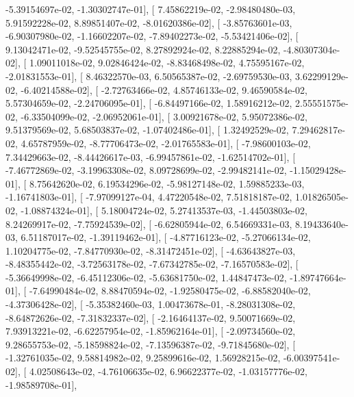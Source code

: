 \documentclass{article}
\begin{document}
         -5.39154697e-02,  -1.30302747e-01],
       [  7.45862219e-02,  -2.98480480e-03,   5.91592228e-02,
          8.89851407e-02,  -8.01620386e-02],
       [ -3.85763601e-03,  -6.90307980e-02,  -1.16602207e-02,
         -7.89402273e-02,  -5.53421406e-02],
       [  9.13042471e-02,  -9.52545755e-02,   8.27892924e-02,
          8.22885294e-02,  -4.80307304e-02],
       [  1.09011018e-02,   9.02846424e-02,  -8.83468498e-02,
          4.75595167e-02,  -2.01831553e-01],
       [  8.46322570e-03,   6.50565387e-02,  -2.69759530e-03,
          3.62299129e-02,  -6.40214588e-02],
       [ -2.72763466e-02,   4.85746133e-02,   9.46590584e-02,
          5.57304659e-02,  -2.24706095e-01],
       [ -6.84497166e-02,   1.58916212e-02,   2.55551575e-02,
         -6.33504099e-02,  -2.06952061e-01],
       [  3.00921678e-02,   5.95072386e-02,   9.51379569e-02,
          5.68503837e-02,  -1.07402486e-01],
       [  1.32492529e-02,   7.29462817e-02,   4.65787959e-02,
         -8.77706473e-02,  -2.01765583e-01],
       [ -7.98600103e-02,   7.34429663e-02,  -8.44426617e-03,
         -6.99457861e-02,  -1.62514702e-01],
       [ -7.46772869e-02,  -3.19963308e-02,   8.09728699e-02,
         -2.99482141e-02,  -1.15029428e-01],
       [  8.75642620e-02,   6.19534296e-02,  -5.98127148e-02,
          1.59885233e-03,  -1.16741803e-01],
       [ -7.97099127e-04,   4.47220548e-02,   7.51818187e-02,
          1.01826505e-02,  -1.08874324e-01],
       [  5.18004724e-02,   5.27413537e-03,  -1.44503803e-02,
          8.24269917e-02,  -7.75924539e-02],
       [ -6.62805944e-02,   6.54669331e-03,   8.19433640e-03,
          6.51187017e-02,  -1.39119462e-01],
       [ -4.87716123e-02,  -5.27066134e-02,   1.10204775e-02,
         -7.84770930e-02,  -8.31472451e-02],
       [ -4.63643827e-03,  -8.48355442e-02,  -3.72563178e-02,
         -7.67342785e-02,  -7.16570583e-02],
       [ -5.36649998e-02,  -6.45112306e-02,  -5.63681750e-02,
          1.44847473e-02,  -1.89747664e-01],
       [ -7.64990484e-02,   8.88470594e-02,  -1.92580475e-02,
         -6.88582040e-02,  -4.37306428e-02],
       [ -5.35382460e-03,   1.00473678e-01,  -8.28031308e-02,
         -8.64872626e-02,  -7.31832337e-02],
       [ -2.16464137e-02,   9.50071669e-02,   7.93913221e-02,
         -6.62257954e-02,  -1.85962164e-01],
       [ -2.09734560e-02,   9.28655753e-02,  -5.18598824e-02,
         -7.13596387e-02,  -9.71845680e-02],
       [ -1.32761035e-02,   9.58814982e-02,   9.25899616e-02,
          1.56928215e-02,  -6.00397541e-02],
       [  4.02508643e-02,  -4.76106635e-02,   6.96622377e-02,
         -1.03157776e-02,  -1.98589708e-01],
\end{document}

